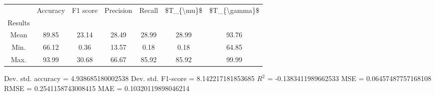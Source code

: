 \begin{tabular}{|c|c|c|c|c|c|c|}
\toprule
{} &  Accuracy &  F1 score &  Precision &  Recall &  \$T\_\{\textbackslash mu\}\$ &  \$T\_\{\textbackslash gamma\}\$ \\
Results &           &           &            &         &            &               \\
\hline
Mean    &     89.85 &     23.14 &      28.49 &   28.99 &      28.99 &         93.76 \\
Min.    &     66.12 &      0.36 &      13.57 &    0.18 &       0.18 &         64.85 \\
Max.    &     93.99 &     30.68 &      66.67 &   85.92 &      85.92 &         99.99 \\
\bottomrule
\end{tabular}

 Dev. std. accuracy = 4.938685180002538
 Dev. std. F1-score = 8.142217181853685
 $R^2$ = -0.1383411989662533
 MSE = 0.06457487757168108
 RMSE = 0.2541158743008415
 MAE = 0.10320119898046214